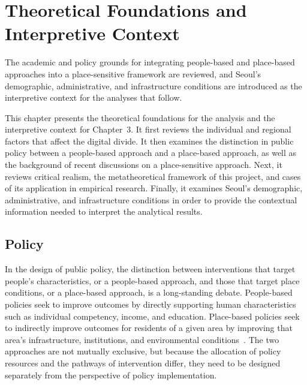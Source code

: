 \section{Theoretical Foundations and Interpretive Context}
\label{sec:theory}


\begin{quoteblock}
The academic and policy grounds for integrating people-based and place-based approaches into a place-sensitive framework are reviewed, and Seoul's demographic, administrative, and infrastructure conditions are introduced as the interpretive context for the analyses that follow.
\end{quoteblock}

This chapter presents the theoretical foundations for the analysis and the interpretive context for Chapter~3. It first reviews the individual and regional factors that affect the digital divide. It then examines the distinction in public policy between a people-based approach and a place-based approach, as well as the background of recent discussions on a place-sensitive approach. Next, it reviews critical realism, the metatheoretical framework of this project, and cases of its application in empirical research. Finally, it examines Seoul's demographic, administrative, and infrastructure conditions in order to provide the contextual information needed to interpret the analytical results.

\subsection{Policy}
\label{subsec:2-1}

In the design of public policy, the distinction between interventions that target people's characteristics, or a people-based approach, and those that target place conditions, or a place-based approach, is a long-standing debate. People-based policies seek to improve outcomes by directly supporting human characteristics such as individual competency, income, and education. Place-based policies seek to indirectly improve outcomes for residents of a given area by improving that area's infrastructure, institutions, and environmental conditions~\citep{NeumarkSimpson2015}. The two approaches are not mutually exclusive, but because the allocation of policy resources and the pathways of intervention differ, they need to be designed separately from the perspective of policy implementation.

